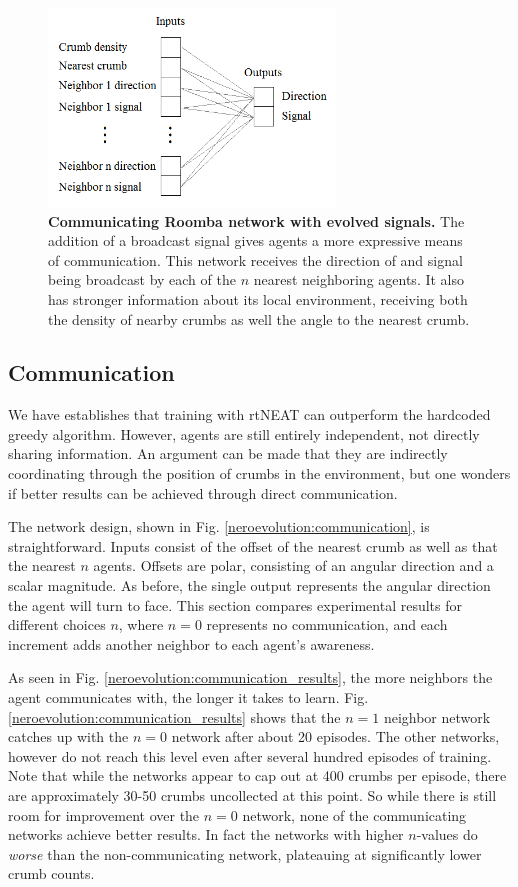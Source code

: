 \documentclass[conference]{IEEEtran}
\begin{document}
\begin{figure}[t]
\centering
\includegraphics[width=3.0in]{./figures/neroevolution/emerg_comm_network.png}
\caption{\textbf{Communicating Roomba network with evolved signals.} The addition of a broadcast signal gives agents a more expressive means of communication. This network receives the direction of and signal being broadcast by each of the $n$ nearest neighboring agents. It also has stronger information about its local environment, receiving both the density of nearby crumbs as well the angle to the nearest crumb.  }
\label{neroevolution:evolved_comunication}
\end{figure}

\subsection{Communication}


We have establishes that training with rtNEAT can outperform the hardcoded greedy algorithm. However, agents are still entirely independent, not directly sharing information. An argument can be made that they are indirectly coordinating through the position of crumbs in the environment, but one wonders if better results can be achieved through direct communication.

The network design, shown in Fig. \ref{neroevolution:communication}, is straightforward. Inputs consist of the offset of the nearest crumb as well as that the nearest $n$ agents. Offsets are polar, consisting of an angular direction and a scalar magnitude. As before, the single output represents the angular direction the agent will turn to face. 
This section compares experimental results for different choices $n$, where $n=0$ represents no communication, and each increment adds another neighbor to each agent's awareness.


As seen in Fig. \ref{neroevolution:communication_results}, the more neighbors the agent communicates with, the longer it takes to learn.  Fig. \ref{neroevolution:communication_results} shows that the $n=1$ neighbor network catches up with the $n=0$ network after about 20 episodes. The other networks, however do not reach this level even after several hundred episodes of training. Note that while the networks appear to cap out at 400 crumbs per episode, there are approximately 30-50 crumbs uncollected at this point. So while there is still room for improvement over the $n=0$ network, none of the communicating networks achieve better results. In fact the networks with higher $n$-values do \textit{worse} than the non-communicating network, plateauing at significantly lower crumb counts.
\end{document}
